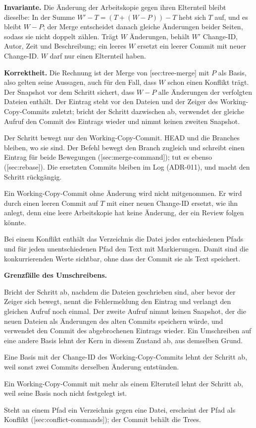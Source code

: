 {\bf Invariante.} Die Änderung der Arbeitskopie gegen ihren Elternteil bleibt dieselbe:
In der Summe $W' - T = (T + (W - P)) - T$ hebt sich $T$ auf, und es bleibt $W - P$;
der Merge entscheidet danach gleiche Änderungen beider Seiten, sodass sie nicht doppelt zählen.
Trägt $W$ Änderungen, behält $W'$ Change-ID, Autor, Zeit und Beschreibung;
ein leeres $W$ ersetzt ein leerer Commit mit neuer Change-ID.
$W$ darf nur einen Elternteil haben.

{\bf Korrektheit.} Die Rechnung ist der Merge von [sec:tree-merge] mit $P$ als
Basis, also gelten seine Aussagen, auch für den Fall, dass $W$ schon einen Konflikt trägt.
Der Snapshot vor dem Schritt sichert, dass $W - P$ alle Änderungen der verfolgten Dateien enthält.
Der Eintrag steht vor den Dateien und der Zeiger des Working-Copy-Commits zuletzt;
bricht der Schritt dazwischen ab, verwendet der gleiche Aufruf den Commit des Eintrags wieder
und nimmt keinen zweiten Snapshot.

Der Schritt bewegt nur den Working-Copy-Commit.
HEAD und die Branches bleiben, wo sie sind.
Der Befehl  bewegt den Branch zugleich und schreibt einen Eintrag für beide
Bewegungen ([sec:merge-command]);
 tut es ebenso ([sec:rebase]).
Die ersetzten Commits bleiben im Log (ADR-011),
und  macht den Schritt rückgängig.

Ein Working-Copy-Commit ohne Änderung wird nicht mitgenommen.
Er wird durch einen leeren Commit auf $T$ mit einer neuen Change-ID ersetzt,
wie ihn  anlegt, denn eine leere Arbeitskopie hat keine Änderung,
der ein Review folgen könnte.

Bei einem Konflikt enthält das Verzeichnis die Datei jedes entschiedenen Pfads
und für jeden unentschiedenen Pfad den Text mit Markierungen.
Damit sind die konkurrierenden Werte sichtbar, ohne dass der Commit sie als Text speichert.

\startinfobox
{\bf Grenzfälle des Umschreibens.}
\startitemize
\item Bricht der Schritt ab, nachdem die Dateien geschrieben sind, aber bevor der Zeiger sich
bewegt, nennt die Fehlermeldung den Eintrag und verlangt den gleichen Aufruf noch einmal.
Der zweite Aufruf nimmt keinen Snapshot, der die neuen Dateien als Änderungen des alten Commits
speichern würde, und verwendet den Commit des abgebrochenen Eintrags wieder.
Ein Umschreiben auf eine andere Basis lehnt der Kern in diesem Zustand ab,
aus demselben Grund.
\item Eine Basis mit der Change-ID des Working-Copy-Commits lehnt der Schritt ab,
weil sonst zwei Commits derselben Änderung entstünden.
\item Ein Working-Copy-Commit mit mehr als einem Elternteil lehnt der Schritt ab,
weil seine Basis noch nicht festgelegt ist.
\item Steht an einem Pfad ein Verzeichnis gegen eine Datei, erscheint der Pfad
als Konflikt ([sec:conflict-commands]); der Commit behält die Trees.
\stopitemize
\stopinfobox

